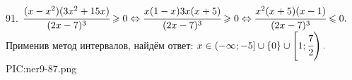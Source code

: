 91. $\cfrac{(x-x^2)(3x^2+15x)}{(2x-7)^3}\geqslant 0\Leftrightarrow
\cfrac{x(1-x)3x(x+5)}{(2x-7)^3}\geqslant0\Leftrightarrow
\cfrac{x^2(x+5)(x-1)}{(2x-7)^3}\leqslant0.$ Применив метод интервалов, найдём ответ: $x\in\left(-\infty;-5\right]\cup\{0\}\cup\left[1;\cfrac{7}{2}\right).$
{{PIC:ner9-87.png}}\\
